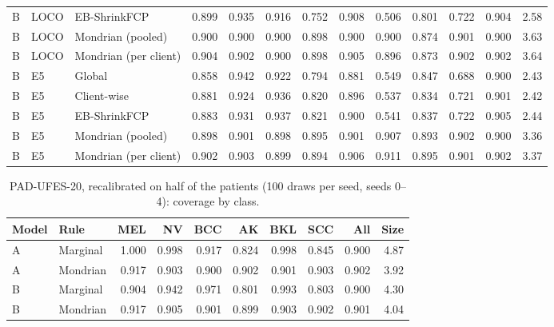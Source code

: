 \documentclass[10pt]{article}
\begin{document}
\begin{table}[!htbp]
\begin{tabular}{@{}lllrrrrrrrrrr@{}}
B & LOCO & EB-ShrinkFCP & 0.899 & 0.935 & 0.916 & 0.752 & 0.908 & 0.506 & 0.801 & 0.722 & 0.904 & 2.58 \\
B & LOCO & Mondrian (pooled) & 0.900 & 0.900 & 0.900 & 0.898 & 0.900 & 0.900 & 0.874 & 0.901 & 0.900 & 3.63 \\
B & LOCO & Mondrian (per client) & 0.904 & 0.902 & 0.900 & 0.898 & 0.905 & 0.896 & 0.873 & 0.902 & 0.902 & 3.64 \\
\midrule
B & E5 & Global & 0.858 & 0.942 & 0.922 & 0.794 & 0.881 & 0.549 & 0.847 & 0.688 & 0.900 & 2.43 \\
B & E5 & Client-wise & 0.881 & 0.924 & 0.936 & 0.820 & 0.896 & 0.537 & 0.834 & 0.721 & 0.901 & 2.42 \\
B & E5 & EB-ShrinkFCP & 0.883 & 0.931 & 0.937 & 0.821 & 0.900 & 0.541 & 0.837 & 0.722 & 0.905 & 2.44 \\
B & E5 & Mondrian (pooled) & 0.898 & 0.901 & 0.898 & 0.895 & 0.901 & 0.907 & 0.893 & 0.902 & 0.900 & 3.36 \\
B & E5 & Mondrian (per client) & 0.902 & 0.903 & 0.899 & 0.894 & 0.906 & 0.911 & 0.895 & 0.901 & 0.902 & 3.37 \\
\bottomrule
\end{tabular}
\end{table}
\begin{table}[!htbp]
\centering
\scriptsize
\caption{PAD-UFES-20, recalibrated on half of the patients (100 draws per seed, seeds 0--4): coverage by class.}
\label{tab:s14pad}
\begin{tabular}{@{}llrrrrrrrr@{}}
\toprule
Model & Rule & MEL & NV & BCC & AK & BKL & SCC & All & Size \\
\midrule
A & Marginal & 1.000 & 0.998 & 0.917 & 0.824 & 0.998 & 0.845 & 0.900 & 4.87 \\
A & Mondrian & 0.917 & 0.903 & 0.900 & 0.902 & 0.901 & 0.903 & 0.902 & 3.92 \\
B & Marginal & 0.904 & 0.942 & 0.971 & 0.801 & 0.993 & 0.803 & 0.900 & 4.30 \\
B & Mondrian & 0.917 & 0.905 & 0.901 & 0.899 & 0.903 & 0.902 & 0.901 & 4.04 \\
\bottomrule
\end{tabular}
\end{table}
\end{document}
